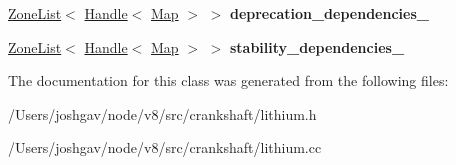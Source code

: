 \begin{DoxyCompactItemize}
\item 
\hyperlink{classv8_1_1internal_1_1_zone_list}{Zone\+List}$<$ \hyperlink{classv8_1_1internal_1_1_handle}{Handle}$<$ \hyperlink{classv8_1_1internal_1_1_map}{Map} $>$ $>$ {\bfseries deprecation\+\_\+dependencies\+\_\+}\hypertarget{classv8_1_1internal_1_1_l_chunk_af96860ccbb121ec1cdc5b8cf5c8762bc}{}\label{classv8_1_1internal_1_1_l_chunk_af96860ccbb121ec1cdc5b8cf5c8762bc}

\item 
\hyperlink{classv8_1_1internal_1_1_zone_list}{Zone\+List}$<$ \hyperlink{classv8_1_1internal_1_1_handle}{Handle}$<$ \hyperlink{classv8_1_1internal_1_1_map}{Map} $>$ $>$ {\bfseries stability\+\_\+dependencies\+\_\+}\hypertarget{classv8_1_1internal_1_1_l_chunk_a1f93a1cc3443d1da802331aae771ea09}{}\label{classv8_1_1internal_1_1_l_chunk_a1f93a1cc3443d1da802331aae771ea09}

\end{DoxyCompactItemize}


The documentation for this class was generated from the following files\+:\begin{DoxyCompactItemize}
\item 
/\+Users/joshgav/node/v8/src/crankshaft/lithium.\+h\item 
/\+Users/joshgav/node/v8/src/crankshaft/lithium.\+cc\end{DoxyCompactItemize}
